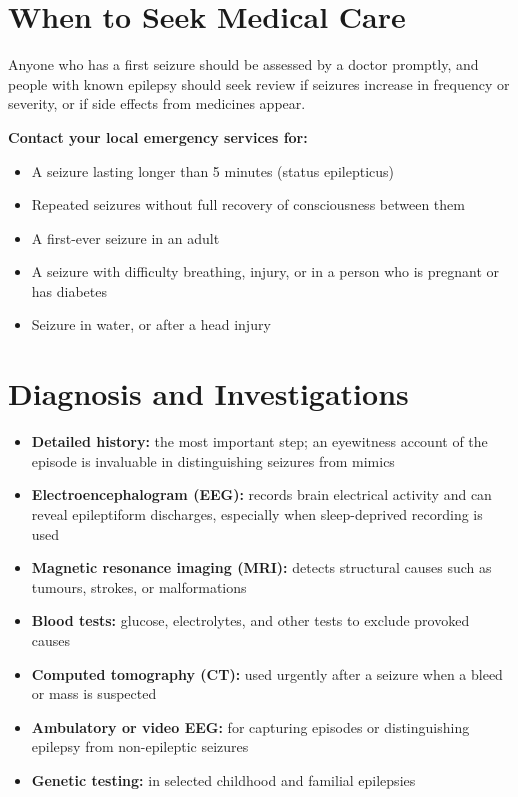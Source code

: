 \section*{When to Seek Medical Care}
Anyone who has a first seizure should be assessed by a doctor promptly, and people with known epilepsy should seek review if seizures increase in frequency or severity, or if side effects from medicines appear.

\textbf{Contact your local emergency services for:}
\begin{itemize}
    \item A seizure lasting longer than 5 minutes (status epilepticus)
    \item Repeated seizures without full recovery of consciousness between them
    \item A first-ever seizure in an adult
    \item A seizure with difficulty breathing, injury, or in a person who is pregnant or has diabetes
    \item Seizure in water, or after a head injury
\end{itemize}

\section*{Diagnosis and Investigations}
\begin{itemize}
    \item \textbf{Detailed history:} the most important step; an eyewitness account of the episode is invaluable in distinguishing seizures from mimics
    \item \textbf{Electroencephalogram (EEG):} records brain electrical activity and can reveal epileptiform discharges, especially when sleep-deprived recording is used
    \item \textbf{Magnetic resonance imaging (MRI):} detects structural causes such as tumours, strokes, or malformations
    \item \textbf{Blood tests:} glucose, electrolytes, and other tests to exclude provoked causes
    \item \textbf{Computed tomography (CT):} used urgently after a seizure when a bleed or mass is suspected
    \item \textbf{Ambulatory or video EEG:} for capturing episodes or distinguishing epilepsy from non-epileptic seizures
    \item \textbf{Genetic testing:} in selected childhood and familial epilepsies
\end{itemize}

